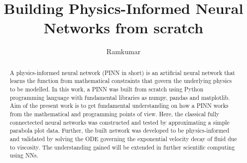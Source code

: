 \documentclass{article}
\title{Building Physics-Informed Neural Networks from scratch}
\author{Ramkumar}
\begin{document}
\maketitle

\tableofcontents

\begin{abstract}
	A physics-informed neural network (PINN in short) is an artificial neural
	network that learns the function from mathematical constraints that govern
	the underlying physics to be modelled. In this work, a PINN was built from
	scratch using Python programming language with fundamental libraries as
	numpy, pandas and matplotlib.  Aim of the present work is to get
	fundamental understanding on how a PINN works from the mathematical  and
	programming points of view.  Here, the classical fully connectected neural
	networks was constructed and tested by approximating a simple parabola plot
	data.  Further, the built network was developed to be physics-informed and
	validated by solving the ODE governing the exponential velocity decay of
	fluid due to viscosity. The understanding gained will be extended in
	further scientific computing using NNs.
\end{abstract}













\printbibliography
\end{document}
